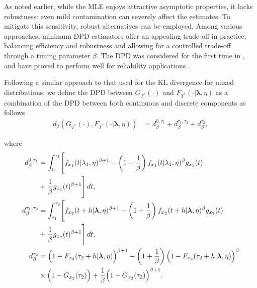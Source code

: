 \documentclass{article}
\begin{document}
As noted earlier, while the MLE enjoys attractive asymptotic properties, it lacks robustness: even mild contamination can severely affect the estimates. To mitigate this sensitivity, robust alternatives can be employed. Among various approaches, minimum DPD estimators offer an appealing trade-off in practice, balancing efficiency and robustness and allowing for a controlled trade-off through a tuning parameter $\beta$.
The DPD was considered for the first time in \cite{basu1997}, and have proved to perform well for reliability applications \cite{balakrishnan2023b,balakrishnan2023c,balakrishnan2023d,balakrishnan2023e,balakrishnan2024a,balakrishnan2024b,balakrishnan2025,jaenada2025,gonzalez2025}.

Following a similar approach to that used for the KL divergence for mixed distributions, we define the DPD between $G_{T^\ast}(\cdot)$ and $F_{T^\ast}(\cdot|\boldsymbol{\lambda},\eta)$ as a combination of the DPD between both continuous and discrete components as follows
\begin{align}
d_{\beta}\!\left(G_{T^\ast}(\cdot), F_{T^\ast}(\cdot|\boldsymbol{\lambda},\eta)\right) \nonumber
&=
d_{\beta}^{0,\tau_1}
+
d_{\beta}^{\tau_1,\tau_2}
+
d_{\beta}^{\tau_2},\nonumber
\end{align}

where
\begin{align}
d_{\beta}^{0,\tau_1}\nonumber
&=
\int_0^{\tau_1}
\Biggl[
f_{x_1}(t|\lambda_1,\eta)^{\beta+1}
-
\left(1+\frac{1}{\beta}\right)
f_{x_1}(t|\lambda_1,\eta)^{\beta}
g_{x_1}(t)\nonumber
\\
&+
\frac{1}{\beta}
g_{x_1}(t)^{\beta+1}
\Biggr]
\,dt,\nonumber
\\
d_{\beta}^{\tau_1,\tau_2}
&=
\int_{\tau_1}^{\tau_2}
\Biggl[
f_{x_2}(t+h|\boldsymbol{\lambda},\eta)^{\beta+1}
-
\left(1+\frac{1}{\beta}\right)
f_{x_2}(t+h|\boldsymbol{\lambda},\eta)^{\beta}
g_{x_2}(t)\nonumber
\\
&+
\frac{1}{\beta}
g_{x_2}(t)^{\beta+1}
\Biggr]
\,dt,\nonumber
\\
d_{\beta}^{\tau_2}
&=
\Bigl(1-F_{x_2}(\tau_2+h|\boldsymbol{\lambda},\eta)\Bigr)^{\beta+1}
-
\left(1+\frac{1}{\beta}\right)
\Bigl(1-F_{x_2}(\tau_2+h|\boldsymbol{\lambda},\eta)\Bigr)^{\beta}\nonumber
\\
&\times \Bigl(1-G_{x_2}(\tau_2)\Bigr)
+
\frac{1}{\beta}
\Bigl(1-G_{x_2}(\tau_2)\Bigr)^{\beta+1}.\nonumber
\end{align}
\end{document}
